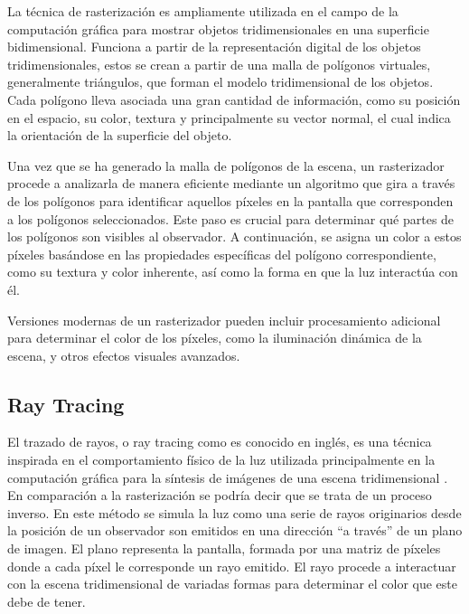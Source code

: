 \documentclass{prgrado}
\begin{document}
La técnica de rasterización es ampliamente utilizada en el campo de la computación gráfica para mostrar objetos tridimensionales en una superficie bidimensional. Funciona a partir de la representación digital de los objetos tridimensionales, estos se crean a partir de una malla de polígonos virtuales, generalmente triángulos, que forman el modelo tridimensional de los objetos. Cada polígono lleva asociada una gran cantidad de información, como su posición en el espacio, su color, textura y principalmente su vector normal, el cual indica la orientación de la superficie del objeto.

Una vez que se ha generado la malla de polígonos de la escena, un rasterizador procede a analizarla de manera eficiente mediante un algoritmo que gira a través de los polígonos para identificar aquellos píxeles en la pantalla que corresponden a los polígonos seleccionados. Este paso es crucial para determinar qué partes de los polígonos son visibles al observador. A continuación, se asigna un color a estos píxeles basándose en las propiedades específicas del polígono correspondiente, como su textura y color inherente, así como la forma en que la luz interactúa con él.

Versiones modernas de un rasterizador pueden incluir procesamiento adicional para determinar el color de los píxeles, como la iluminación dinámica de la escena, y otros efectos visuales avanzados.

\subsection{Ray Tracing}

El trazado de rayos, o ray tracing como es conocido en inglés, es una técnica inspirada en el comportamiento físico de la luz utilizada principalmente en la computación gráfica para la síntesis de imágenes de una escena tridimensional \cite{Raytracing}. En comparación a la rasterización se podría decir que se trata de un proceso inverso. En este método se simula la luz como una serie de rayos originarios desde la posición de un observador son emitidos en una dirección “a través” de un plano de imagen. El plano representa la pantalla, formada por una matriz de píxeles donde a cada píxel le corresponde un rayo emitido. El rayo procede a interactuar con la escena tridimensional de variadas formas para determinar el color que este debe de tener.
\end{document}

